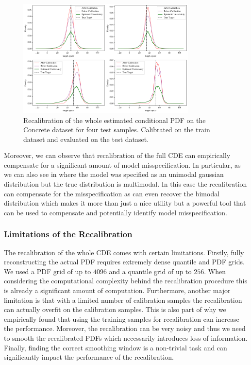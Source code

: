 \begin{figure}
    \centering
    \includegraphics[width=0.8\textwidth]{resources/recalibration_concrete_dataset.png}
    \caption[Recalibration of the whole estimated conditional PDF]{Recalibration of the whole estimated conditional PDF on the Concrete dataset for four test samples. Calibrated on the train dataset and evaluated on the test dataset.}\label{fig:recalibration_concrete}
\end{figure}

Moreover, we can observe that recalibration of the full CDE can empirically compensate for a significant amount of model misspecification. In particular, as we can also see in  where the model was specified as an unimodal gaussian distribution but the true distribution is multimodal. In this case the recalibration can compensate for the misspecification as can even recover the bimodal distribution which makes it more than just a nice utility but a powerful tool that can be used to compensate and potentially identify model misspecification.

\subsubsection{Limitations of the Recalibration}

The recalibration of the whole CDE comes with certain limitations. Firstly, fully reconstructing the actual PDF requires extremely dense quantile and PDF grids. We used a PDF grid of up to $4096$ and a quantile grid of up to $256$. When considering the computational complexity behind the recalibration procedure this is already a significant amount of computation. Furthermore, another major limitation is that with a limited number of calibration samples the recalibration can actually overfit on the calibration samples. This is also part of why we empirically found that using the training samples for recalibration can increase the performance. Moreover, the recalibration can be very noisy and thus we need to smooth the recalibrated PDFs which necessarily introduces loss of information. Finally, finding the correct smoothing window is a non-trivial task and can significantly impact the performance of the recalibration.

